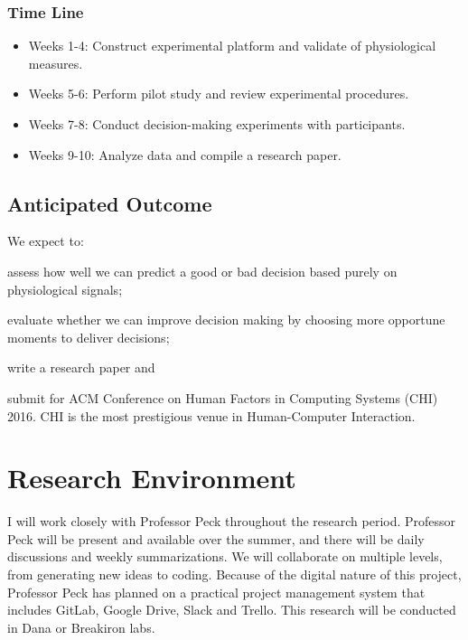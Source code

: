 \documentclass[12pt]{article}
\begin{document}
\subsubsection{Time Line}
\begin{itemize} 
\itemsep0pt\parskip0pt
\item Weeks 1-4: Construct experimental platform and validate of physiological measures.
\item Weeks 5-6: Perform pilot study and review experimental procedures.
\item Weeks 7-8: Conduct decision-making experiments with participants.
\item Weeks 9-10: Analyze data and compile a research paper.
\end{itemize}


\subsection{Anticipated Outcome}\label{anticipated-outcome}
We expect to:
\begin{inparaenum}[\itshape 1\upshape)]
\item
  assess how well we can predict a good or bad decision based purely on physiological signals;
\item 
  evaluate whether we can improve decision making by choosing more opportune moments to deliver decisions;
\item
  write a research paper and
\item
  submit for ACM Conference on Human Factors in Computing Systems (CHI) 2016. CHI is the most prestigious venue in Human-Computer Interaction.
\end{inparaenum}


\section{Research Environment}\label{research-environment}

I will work closely with Professor Peck throughout the research period.
Professor Peck will be present and available over the summer, and there
will be daily discussions and weekly summarizations. We will collaborate
on multiple levels, from generating new ideas to coding. Because of the
digital nature of this project, Professor Peck has planned on a
practical project management system that includes GitLab, Google Drive, Slack and Trello. This research will be conducted in Dana or Breakiron labs.
    
\begingroup
{}


\endgroup
\end{document}
